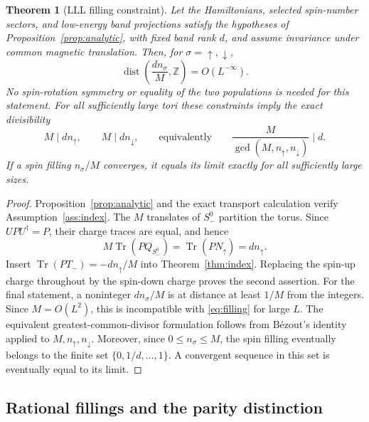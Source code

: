 \documentclass[11pt]{article}
\newtheorem{theorem}{Theorem}[section]
\theoremstyle{definition}
\theoremstyle{remark}
\newcommand{\Tr}{\operatorname{Tr}}
\newcommand{\dist}{\operatorname{dist}}
\newcommand{\up}{\uparrow}
\newcommand{\dn}{\downarrow}
\begin{document}
\begin{theorem}[LLL filling constraint]\label{thm:filling}
Let the Hamiltonians, selected spin-number sectors, and low-energy
band projections satisfy the hypotheses of
Proposition~\ref{prop:analytic}, with fixed band rank \(d\),
and assume invariance under common
magnetic translation.  Then, for \(\sigma=\up,\dn\),
\begin{equation}\label{eq:filling}
 \dist\left(\frac{dn_\sigma}{M},\mathbb Z\right)
       =O(L^{-\infty}).
\end{equation}
No spin-rotation symmetry or equality of the two populations is
needed for this statement.
For all sufficiently large tori these constraints imply the exact
divisibility
\begin{equation}\label{eq:finiteinteger}
 M\mid dn_\up,\qquad M\mid dn_\dn,
 \qquad\text{equivalently}\qquad
 \frac{M}{\gcd(M,n_\up,n_\dn)}\mid d.
\end{equation}
If a spin filling \(n_\sigma/M\) converges, it equals its limit
exactly for all sufficiently large sizes.
\end{theorem}
\begin{proof}
Proposition~\ref{prop:analytic} and the exact transport calculation
verify Assumption~\ref{ass:index}.  The \(M\) translates of
\(S_-^0\) partition the torus.  Since \(UPU^\dagger=P\),
their charge traces are equal, and hence
\[
 M\Tr(PQ_{S_-^0})=\Tr(PN_\up)=dn_\up.
\]
Insert \(\Tr(PT_-)=-dn_\up/M\) into Theorem~\ref{thm:index}.
Replacing the spin-up charge throughout by the spin-down charge
proves the second assertion.
For the final statement, a noninteger \(dn_\sigma/M\) is at
distance at least \(1/M\) from the integers.  Since \(M=O(L^2)\),
this is incompatible with \eqref{eq:filling} for large \(L\).
The equivalent greatest-common-divisor formulation follows from
B\'ezout's identity applied to \(M,n_\up,n_\dn\).
Moreover, since \(0\le n_\sigma\le M\), the spin filling eventually
belongs to the finite set \(\{0,1/d,\ldots,1\}\).  A convergent
sequence in this set is eventually equal to its limit.
\end{proof}

\subsection{Rational fillings and the parity distinction}
\end{document}
